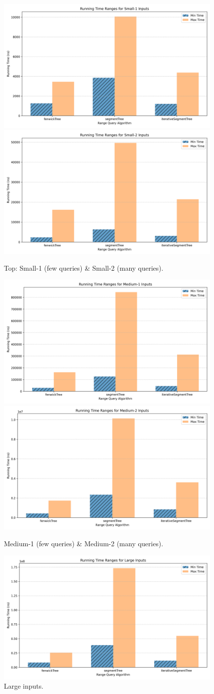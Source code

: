 \documentclass[12pt]{article}
\begin{document}
\begin{figure}[H]
  \centering
  \includegraphics[width=0.45\linewidth]{range-queries-stats-small-1.png}
  \includegraphics[width=0.45\linewidth]{range-queries-stats-small-2.png}
  \caption{Top: Small-1 (few queries) \& Small-2 (many queries).}
\end{figure}

\begin{figure}[H]
  \centering
  \includegraphics[width=0.45\linewidth]{range-queries-stats-medium-1.png}
  \includegraphics[width=0.45\linewidth]{range-queries-stats-medium-2.png}
  \caption{Medium-1 (few queries) \& Medium-2 (many queries).}
\end{figure}

\begin{figure}[H]
  \centering
  \includegraphics[width=0.7\linewidth]{range-queries-stats-large.png}
  \caption{Large inputs.}
\end{figure}
\end{document}
